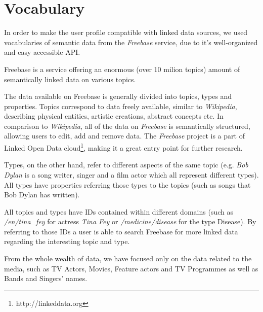 \section{Vocabulary}

In order to make the user profile compatible with linked data sources, we used
vocabularies of semantic data from the \textit{Freebase} service, due to it's
well-organized and easy accessible API.

Freebase is a service offering an enormous (over 10 milion topics) amount of semantically linked data on various topics.

The data available on Freebase is generally divided into topics, types and properties. Topics correspond to data freely
available, similar to \textit{Wikipedia}, describing physical entities, artistic creations, abstract concepts etc. In comparison
to \textit{Wikipedia}, all of the data on \textit{Freebase} is semantically structured, allowing users to edit, add and remove data. The \textit{Freebase} project is a part of Linked Open Data cloud\footnote{http://linkeddata.org}, making it a great
entry point for further research.

Types, on the other hand, refer to different aspects of the same topic (e.g. \textit{Bob Dylan} is a song writer,
singer and a film actor which all represent different types). All types have properties referring those
types to the topics (such as songs that Bob Dylan has written).

All topics and types have IDs contained within different domains (such as \textit{/en/tina\_fey} for actress \textit{Tina Fey}
or \textit{/medicine/disease} for the type Disease). By referring to those IDs a user is able to search Freebase for
more linked data regarding the interesting topic and type.

From the whole wealth of data, we have focused only on the data related to the media, such as TV Actors, Movies, Feature
actors and TV Programmes as well as Bands and Singers' names.